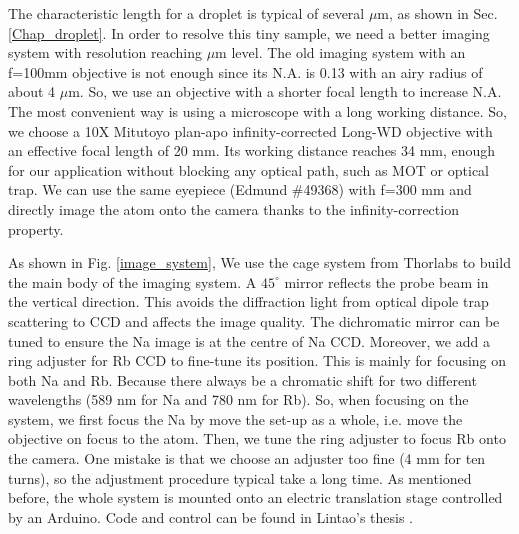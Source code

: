 The characteristic length for a droplet is typical of several $\mu$m, as shown in Sec. \ref{Chap_droplet}. In order to resolve this tiny sample, we need a better imaging system with resolution reaching $\mu$m level. The old imaging system with an f=100mm objective is not enough since its N.A. is 0.13 with an airy radius of about 4 $\mu$m. So, we use an objective with a shorter focal length to increase N.A. The most convenient way is using a microscope with a long working distance. So, we choose a 10X Mitutoyo plan-apo infinity-corrected Long-WD objective with an effective focal length of 20 mm. Its working distance reaches 34 mm, enough for our application without blocking any optical path, such as MOT or optical trap. We can use the same eyepiece (Edmund \#49368) with f=300 mm and directly image the atom onto the camera thanks to the infinity-correction property. 

As shown in Fig. \ref{image_system}, We use the cage system from Thorlabs to build the main body of the imaging system. A $45^\circ$ mirror reflects the probe beam in the vertical direction. This avoids the diffraction light from optical dipole trap scattering to CCD and affects the image quality. The dichromatic mirror can be tuned to ensure the Na image is at the centre of Na CCD. Moreover, we add a ring adjuster for Rb CCD to fine-tune its position. This is mainly for focusing on both Na and Rb. Because there always be a chromatic shift for two different wavelengths (589 nm for Na and 780 nm for Rb). So, when focusing on the system, we first focus the Na by move the set-up as a whole, i.e. move the objective on focus to the atom. Then, we tune the ring adjuster to focus Rb onto the camera. One mistake is that we choose an adjuster too fine (4 mm for ten turns), so the adjustment procedure typical take a long time. As mentioned before, the whole system is mounted onto an electric translation stage controlled by an Arduino. Code and control can be found in Lintao's thesis \cite{LiLintao2021}.

